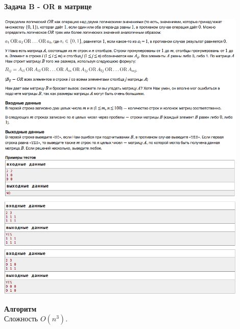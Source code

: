 \documentclass[a4paper,12pt]{article}
\begin{document}
\newpage
\textbf{{\large Задача B - OR в матрице}} \\
\begin{center}
\includegraphics[width=0.9\textwidth]{C_277/C_277_B1.png}\\
\includegraphics[width=0.9\textwidth]{C_277/C_277_B2.png}\\ [1cm]
\end{center}
\textbf{{\large Алгоритм}} \\
Сложность $O(n^3)$.\\
\end{document}
